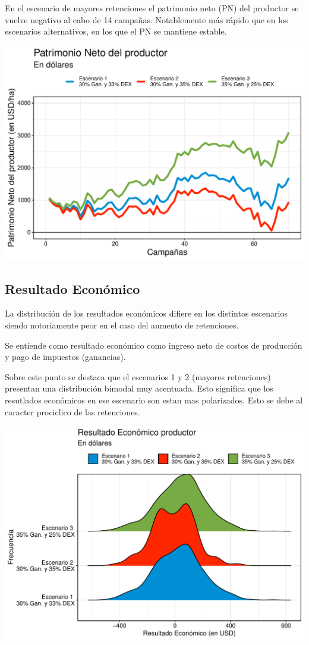 \documentclass[
  12pt,
  spanish,
  10pt]{article}
\begin{document}
En el escenario de mayores retenciones el patrimonio neto (PN) del
productor se vuelve negativo al cabo de 14 campañas. Notablemente más
rápido que en los escenarios alternativos, en los que el PN se mantiene
estable.

\begin{center}\includegraphics{simulacion_retenciones_files/figure-latex/unnamed-chunk-16-1} \end{center}

\hypertarget{resultado-econuxf3mico}{%
\subsection{Resultado Económico}\label{resultado-econuxf3mico}}

La distribución de los resultados económicos difiere en los distintos
escenarios siendo notoriamente peor en el caso del aumento de
retenciones.

Se entiende como resultado económico como ingreso neto de costos de
producción y pago de impuestos (ganancias).

Sobre este punto se destaca que el escenarios 1 y 2 (mayores
retenciones) presentan una distribución bimodal muy acentuada. Esto
significa que los resutlados económicos en ese escenario son estan mas
polarizados. Esto se debe al caracter prociclico de las retenciones.

\includegraphics{simulacion_retenciones_files/figure-latex/unnamed-chunk-18-1.pdf}
\end{document}
